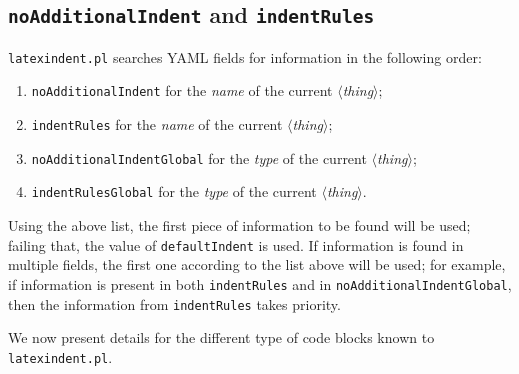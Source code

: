 \subsection{\texttt{noAdditionalIndent} and \texttt{indentRules}}\label{sec:noadd-indent-rules}
	\texttt{latexindent.pl} searches YAML fields for information in the following order:
	\begin{enumerate}
		\item \texttt{noAdditionalIndent} for the \emph{name} of the current \emph{$\langle$thing$\rangle$};
		\item \texttt{indentRules} for the \emph{name} of the current \emph{$\langle$thing$\rangle$};
		\item \texttt{noAdditionalIndentGlobal} for the \emph{type} of the current \emph{$\langle$thing$\rangle$};
		\item \texttt{indentRulesGlobal} for the \emph{type} of the current \emph{$\langle$thing$\rangle$}.
	\end{enumerate}

	Using the above list, the first piece of information to be found will be used; failing that,
	the value of \texttt{defaultIndent} is used.
	If information is found in multiple fields, the first one according to the list above will be used; for example,
	if information is present in both \texttt{indentRules} and in \texttt{noAdditionalIndentGlobal}, then the information from \texttt{indentRules}
	takes priority.

	We now present details for the different type of code blocks known to \texttt{latexindent.pl}.
